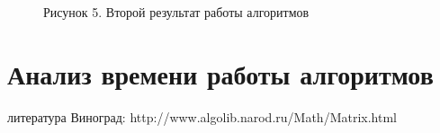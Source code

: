 \documentclass[12pt]{report}
\begin{document}
	\begin{figure}[h!]\label{Result2}
		\caption*{Рисунок 5. Второй результат работы алгоритмов}
	\end{figure}

	\section{Анализ времени работы алгоритмов }
	
	\newpage
	литература 
	Виноград: http://www.algolib.narod.ru/Math/Matrix.html
\end{document}
